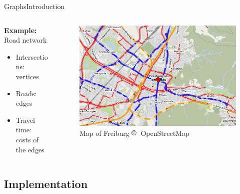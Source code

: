 \begin{frame}{Graphs}{Introduction}
  \begin{columns}
    \begin{column}{0.40\linewidth}
      \textbf{Example:} Road network
      \begin{itemize}
        \item<2->
          Intersections: {\color{Mittel-Blau}vertices}
        \item<3->
          Roads: {\color{Mittel-Blau}edges}
        \item<4->
          Travel time:\\
          {\color{Mittel-Blau}costs of the edges}
      \end{itemize}
    \end{column}
    \begin{column}{0.6\linewidth}
      \begin{figure}[!h]
        \includegraphics[width=\linewidth]
          {Images/Graphs/Freiburg_OpenStreetMap.png}
        \caption{Map of Freiburg $\copyright$~OpenStreetMap}
        \label{fig:graphs:introduction_freiburg_osm}
      \end{figure}
    \end{column}
  \end{columns}
\end{frame}



\subsection{Implementation}

